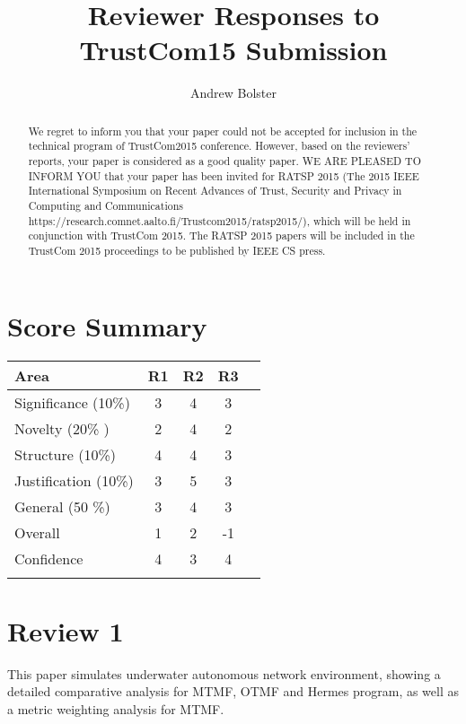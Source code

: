 \documentclass[]{article}
\title{Reviewer Responses to TrustCom15 Submission}
\author{Andrew Bolster}
\begin{document}
\maketitle

\begin{abstract}
We regret to inform you that your paper could not be accepted for inclusion in the technical program of
TrustCom2015 conference. However, based on the reviewers' reports, your paper is considered as a
good quality paper. WE ARE PLEASED TO INFORM YOU that your paper has been invited for RATSP 2015
(The 2015 IEEE International Symposium on Recent Advances of Trust, Security and Privacy in
Computing and Communications https://research.comnet.aalto.fi/Trustcom2015/ratsp2015/), which
will be held in conjunction with TrustCom 2015. The RATSP 2015 papers will be included in the
TrustCom 2015 proceedings to be published by IEEE CS press.
\end{abstract}

\section{Score Summary}

\begin{tabular}{|l|c|c|c||c}
	\toprule
	\textbf{Area}        & \textbf{R1} & \textbf{R2} & \textbf{R3} \\ \midrule
	Significance (10\%)  &      3      &      4      &      3      \\
	Novelty (20\% )      &      2      &      4      &      2      \\
	Structure (10\%)     &      4      &      4      &      3      \\
	Justification (10\%) &      3      &      5      &      3      \\
	General (50 \%)      &      3      &      4      &      3      \\ \midrule
	Overall              &      1      &      2      &     -1      \\
	Confidence           &      4      &      3      &      4      \\ \bottomrule& 
\end{tabular} 

\section{Review 1}

This paper simulates underwater autonomous network environment, showing a detailed comparative analysis for MTMF, OTMF and Hermes program, as well as a metric weighting analysis for MTMF. 
\end{document}
